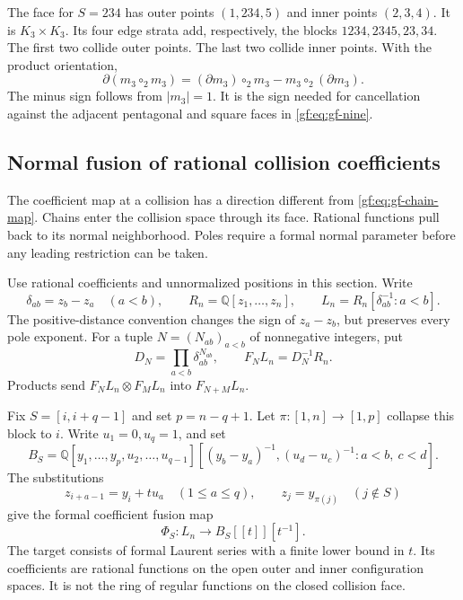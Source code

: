 \begin{example}
The face for \(S=234\) has outer points \((1,234,5)\) and
inner points \((2,3,4)\).  It is \(K_3\times K_3\).
Its four edge strata add, respectively, the blocks
\(1234,2345,23,34\).  The first two collide outer points.
The last two collide inner points.  With the product orientation,
\[
 \partial(m_3\circ_2m_3)
   =(\partial m_3)\circ_2m_3-m_3\circ_2(\partial m_3).
\]
The minus sign follows from \(|m_3|=1\).
It is the sign needed for cancellation against the adjacent
pentagonal and square faces in \eqref{gf:eq:gf-nine}.
\end{example}

\subsection{Normal fusion of rational collision coefficients}
\label{gf:sec:gf-rational}

The coefficient map at a collision has a direction different from
\eqref{gf:eq:gf-chain-map}.  Chains enter the collision space through
its face.  Rational functions pull back to its normal neighborhood.
Poles require a formal normal parameter before any leading restriction
can be taken.

Use rational coefficients and unnormalized positions in this section.
Write
\[
 \delta_{ab}=z_b-z_a\quad(a<b),\qquad
 R_n=\mathbb Q[z_1,\ldots,z_n],\qquad
 L_n=R_n[\delta_{ab}^{-1}:a<b].
\]
The positive-distance convention changes the sign of \(z_a-z_b\),
but preserves every pole exponent.  For a tuple
\(N=(N_{ab})_{a<b}\) of nonnegative integers, put
\[
 D_N=\prod_{a<b}\delta_{ab}^{N_{ab}},\qquad
 F_NL_n=D_N^{-1}R_n.
\]
Products send \(F_NL_n\otimes F_ML_n\) into \(F_{N+M}L_n\).

Fix \(S=[i,i+q-1]\) and set \(p=n-q+1\).
Let \(\pi:[1,n]\to[1,p]\) collapse this block to \(i\).
Write \(u_1=0,u_q=1\), and set
\[
 B_S=\mathbb Q[y_1,\ldots,y_p,u_2,\ldots,u_{q-1}]
       [(y_b-y_a)^{-1},(u_d-u_c)^{-1}:a<b,\ c<d].
\]
The substitutions
\begin{equation}\label{gf:eq:gf-one-substitution}
 z_{i+a-1}=y_i+t u_a\quad(1\leq a\leq q),\qquad
 z_j=y_{\pi(j)}\quad(j\notin S)
\end{equation}
give the formal coefficient fusion map
\begin{equation}\label{gf:eq:gf-one-ring}
 \Phi_S:L_n\longrightarrow B_S[[t]][t^{-1}].
\end{equation}
The target consists of formal Laurent series with a finite lower
bound in \(t\).  Its coefficients are rational functions on
the open outer and inner configuration spaces.  It is not the
ring of regular functions on the closed collision face.

